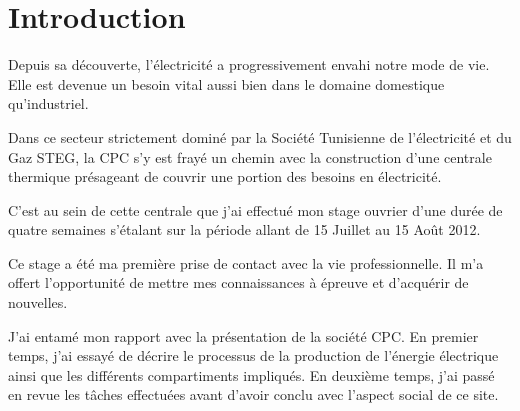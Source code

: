 \chapter*{Introduction}
Depuis sa découverte, l'électricité a progressivement envahi  notre mode de vie.\\Elle est devenue un besoin vital aussi bien dans le domaine domestique qu'industriel.

Dans ce secteur strictement dominé par la Société Tunisienne de l'électricité et du Gaz STEG, la CPC s'y est frayé un chemin  avec la construction d'une centrale thermique présageant de couvrir une portion des besoins en électricité.

C'est au sein de cette centrale que j'ai effectué mon stage ouvrier d'une durée de quatre semaines s'étalant sur la période allant de 15 Juillet au 15 Août 2012. 

Ce stage a été  ma première  prise de contact avec  la vie professionnelle. Il m'a offert l'opportunité de mettre mes connaissances à épreuve et d'acquérir de nouvelles.

J'ai entamé mon rapport avec la présentation de la société CPC. En premier temps, j'ai essayé de décrire le processus de la production de l'énergie électrique ainsi que les différents compartiments impliqués. En deuxième temps, j'ai passé en revue  les tâches effectuées avant d'avoir conclu avec l'aspect social de ce site. 